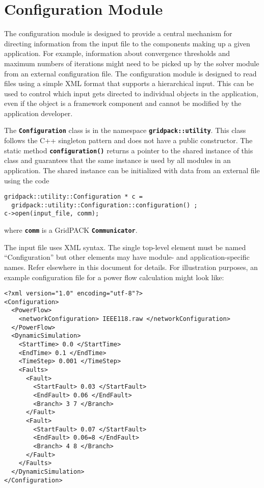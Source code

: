 \section{Configuration Module }\label{configuration}

The configuration module is designed to provide a central mechanism for directing information from the input file to the components making up a given application. For example, information about convergence thresholds and maximum numbers of iterations might need to be picked up by the solver module from an external configuration file. The configuration module is designed to read files using a simple XML format that supports a hierarchical input. This can be used to control which input gets directed to individual objects in the application, even if the object is a framework component and cannot be modified by the application developer.

The \texttt{\textbf{Configuration}} class is in the namespace
\texttt{\textbf{gridpack::utility}}. This class follows the C++ singleton
pattern and does not have a public constructor. The static method
\texttt{\textbf{configuration()}} returns a pointer to the shared instance of
this class and guarantees that the same instance is used by all modules in an application. The shared instance can be initialized with data from an external file using the code

{
\color{red}
\begin{Verbatim}[fontseries=b]
gridpack::utility::Configuration * c = 
  gridpack::utility::Configuration::configuration() ; 
c->open(input_file, comm);
\end{Verbatim}
}

where \texttt{\textbf{comm}} is a GridPACK \texttt{\textbf{Communicator}}.

The input file uses XML syntax. The single top-level element must be named
``Configuration'' but other elements may have module- and application-specific
names. Refer elsewhere in this document for details.  For illustration purposes,
an example configuration file for a power flow calculation might look like: 

{
\color{blue}
\bfseries
\begin{Verbatim}[commandchars=\\\{\}]
<?xml version="1.0" encoding="utf-8"?>
<Configuration>
  <PowerFlow>
    <networkConfiguration> IEEE118.raw </networkConfiguration>
  </PowerFlow>
  <DynamicSimulation>
    <StartTime> 0.0 </StartTime>
    <EndTime> 0.1 </EndTime>
    <TimeStep> 0.001 </TimeStep>
    <Faults>
      <Fault>
        <StartFault> 0.03 </StartFault>
        <EndFault> 0.06 </EndFault>
        <Branch> 3 7 </Branch>
      </Fault>
      <Fault>
        <StartFault> 0.07 </StartFault>
        <EndFault> 0.06=8 </EndFault>
        <Branch> 4 8 </Branch>
      </Fault>
    </Faults>
  </DynamicSimulation>
</Configuration>
\end{Verbatim}
}

